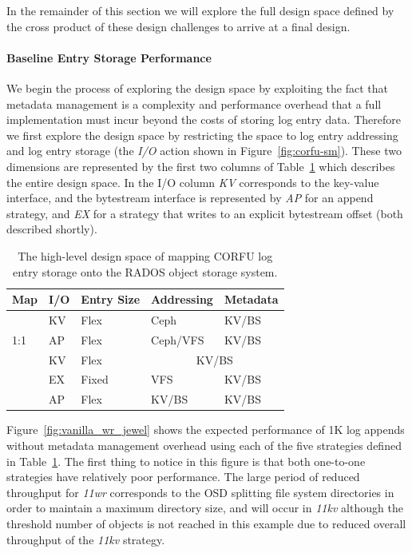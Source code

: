 \documentclass[10pt,twocolumn]{article}
\begin{document}
In the remainder of this section we will explore the full design space defined
by the cross product of these design challenges to arrive at a final design.

\paragraph*{Baseline Entry Storage Performance}
We begin the process of exploring the design space by exploiting the fact that
metadata management is a complexity and performance overhead that a full
implementation must incur beyond the costs of storing log entry data.
Therefore we first explore the design space by restricting the
space to log entry addressing and log entry storage (the \emph{I/O} action
shown in Figure~\ref{fig:corfu-sm}).  These two dimensions are
represented by the first two columns of Table~\ref{tab:pd-map} which describes
the entire design space. In the I/O column \emph{KV} corresponds to the
key-value interface, and the bytestream interface is represented by \emph{AP}
for an append strategy, and \emph{EX} for a strategy that writes to an
explicit bytestream offset (both described shortly).

\begin{table}[h]
\begin{tabular}{ | l | l | l | l | l |}
\hline
Map & I/O & Entry Size & Addressing & Metadata \\ \hline
\multirow{3}{*}{1:1} & KV  & Flex     & Ceph      & KV/BS \\ \cline{2-5}
                     & AP  & Flex     & Ceph/VFS  & KV/BS \\ \hline
\multirow{4}{*}{N:1} & KV  & Flex     & \multicolumn{2}{|c|}{KV/BS} \\ \cline{2-5}
                     & EX  & Fixed    & VFS       & KV/BS \\ \cline{2-5}
                     & AP  & Flex     & KV/BS     & KV/BS \\
\hline
\end{tabular}
\caption{The high-level design space of mapping CORFU log entry storage onto
the RADOS object storage system.}
\label{tab:pd-map}
\end{table}

Figure~\ref{fig:vanilla_wr_jewel} shows the expected performance of 1K log
appends without metadata management overhead using each of the five strategies
defined in Table~\ref{tab:pd-map}. The first thing to notice in this figure is
that both one-to-one strategies have relatively poor performance. The large
period of reduced throughput for \emph{11wr} corresponds to the OSD splitting
file system directories in order to maintain a maximum directory size, and
will occur in \emph{11kv} although the threshold number of objects is not
reached in this example due to reduced overall throughput of the \emph{11kv}
strategy.
\end{document}

